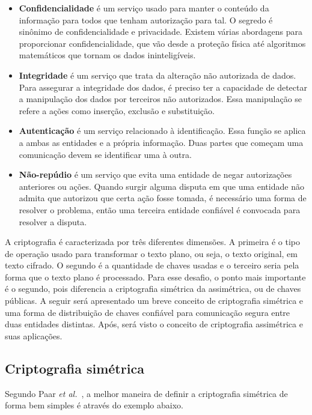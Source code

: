 \documentclass{article}
\begin{document}
\begin{itemize}
  \item \textbf{Confidencialidade} é um serviço usado para manter o conteúdo da
      informação para todos que tenham autorização para tal. O segredo é
        sinônimo de confidencialidade e privacidade. Existem várias abordagens
        para proporcionar confidencialidade, que vão desde a proteção física
        até algoritmos matemáticos que tornam os dados ininteligíveis.
  \item \textbf{Integridade} é um serviço que trata da alteração não autorizada
      de dados. Para assegurar a integridade dos dados, é preciso ter a
        capacidade de detectar a manipulação dos dados por terceiros não
        autorizados. Essa manipulação se refere a ações como inserção, exclusão
        e substituição.
  \item \textbf{Autenticação} é um serviço relacionado à identificação. Essa
      função se aplica a ambas as entidades e a própria informação. Duas partes
        que começam uma comunicação devem se identificar uma à outra.
  \item \textbf{Não-repúdio} é um serviço que evita uma entidade de negar
      autorizações anteriores ou ações. Quando surgir alguma disputa em que uma
        entidade não admita que autorizou que certa ação fosse tomada, é
        necessário uma forma de resolver o problema, então uma terceira
        entidade confiável é convocada para resolver a disputa.
\end{itemize}

A criptografia é caracterizada por três diferentes dimensões. A primeira é o
tipo de operação usado para transformar o texto plano, ou seja, o texto
original, em texto cifrado. O segundo é a quantidade de chaves usadas e o
terceiro seria pela forma que o texto plano é processado. Para esse desafio, o
ponto mais importante é o segundo, pois diferencia a criptografia simétrica da
assimétrica, ou de chaves públicas. A seguir será apresentado um breve conceito
de criptografia simétrica e uma forma de distribuição de chaves confiável para
comunicação segura entre duas entidades distintas. Após, será visto o conceito
de criptografia assimétrica e suas aplicações.

\subsection{Criptografia simétrica}\label{subsec:symmetric}

Segundo Paar \textit{et al.}~\cite{Paar:book:2009}, a melhor maneira de definir
a criptografia simétrica de forma bem simples é através do exemplo abaixo.
\end{document}
